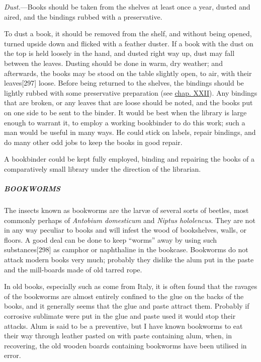 \documentclass[
]{article}
\begin{document}
\emph{Dust.}---Books should be taken from the shelves at least once a
year, dusted and aired, and the bindings rubbed with a preservative.

To dust a book, it should be removed from the shelf, and without being
opened, turned upside down and flicked with a feather duster. If a book
with the dust on the top is held loosely in the hand, and dusted right
way up, dust may fall between the leaves. Dusting should be done in
warm, dry weather; and afterwards, the books may be stood on the table
slightly open, to air, with their
leaves{\protect\hypertarget{Page_297}{}{{[}297{]}}} loose. Before being
returned to the shelves, the bindings should be lightly rubbed with some
preservative preparation (see \protect\hyperlink{CHAPTER_XXII}{chap.
XXII}). Any bindings that are broken, or any leaves that are loose
should be noted, and the books put on one side to be sent to the binder.
It would be best when the library is large enough to warrant it, to
employ a working bookbinder to do this work; such a man would be useful
in many ways. He could stick on labels, repair bindings, and do many
other odd jobs to keep the books in good repair.

A bookbinder could be kept fully employed, binding and repairing the
books of a comparatively small library under the direction of the
librarian.

\hypertarget{bookworms}{%
\subparagraph{BOOKWORMS}\label{bookworms}}

The insects known as bookworms are the larvæ of several sorts of
beetles, most commonly perhaps of \emph{Antobium domesticum} and
\emph{Niptus hololencus}. They are not in any way peculiar to books and
will infest the wood of bookshelves, walls, or floors. A good deal can
be done to keep ``worms'' away by using such
substances{\protect\hypertarget{Page_298}{}{{[}298{]}}} as camphor or
naphthaline in the bookcase. Bookworms do not attack modern books very
much; probably they dislike the alum put in the paste and the
mill-boards made of old tarred rope.

In old books, especially such as come from Italy, it is often found that
the ravages of the bookworms are almost entirely confined to the glue on
the backs of the books, and it generally seems that the glue and paste
attract them. Probably if corrosive sublimate were put in the glue and
paste used it would stop their attacks. Alum is said to be a preventive,
but I have known bookworms to eat their way through leather pasted on
with paste containing alum, when, in recovering, the old wooden boards
containing bookworms have been utilised in error.
\end{document}
